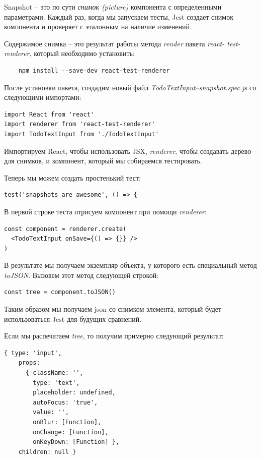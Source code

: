 Snapshot -- это по сути \textit{снимок (picture)} компонента с определенными параметрами. Каждый раз, когда мы запускаем тесты, Jest создает снимок компонента и проверяет с эталонным на наличие изменений.

Содержимое снимка -- это результат работы метода \textit{render} пакета \textit{react- test-renderer}, который необходимо установить:

\begin{lstlisting}
	npm install --save-dev react-test-renderer
\end{lstlisting}

После установки пакета, создадим новый файл \textit{TodoTextInput–snapshot.spec.js} со следующими импортами:

\begin{lstlisting}
import React from 'react'
import renderer from 'react-test-renderer'
import TodoTextInput from './TodoTextInput'
\end{lstlisting}

Импортируем React, чтобы использовать JSX, \textit{renderer}, чтобы создавать дерево для снимков, и компонент, который мы собираемся тестировать.

Теперь мы можем создать простенький тест:

\begin{lstlisting}
test('snapshots are awesome', () => {
\end{lstlisting}

В первой строке теста отрисуем компонент при помощи \textit{renderer}:

\begin{lstlisting}
const component = renderer.create(
  <TodoTextInput onSave={() => {}} />
)
\end{lstlisting}

В результате мы получаем экземпляр объекта, у которого есть специальный метод \textit{toJSON}. Вызовем этот метод следующей строкой:

\begin{lstlisting}
const tree = component.toJSON()
\end{lstlisting}

Таким образом мы получаем json со снимком элемента, который будет использоваться Jest для будущих сравнений.

Если мы распечатаем \textit{tree}, то получим примерно следующий результат:

\begin{lstlisting}
{ type: 'input',
    props:
      { className: '',
        type: 'text',
        placeholder: undefined,
        autoFocus: 'true',
        value: '',
        onBlur: [Function],
        onChange: [Function],
        onKeyDown: [Function] },
    children: null }
\end{lstlisting} 

